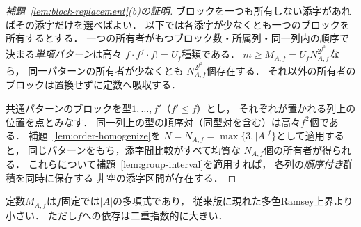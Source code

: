 \begin{proof}[補題~\ref{lem:block-replacement}(b)の証明]
ブロックを一つも所有しない添字があればその添字だけを選べばよい．
以下では各添字が少なくとも一つのブロックを所有するとする．
一つの所有者がもつブロック数・所属列・同一列内の順序で
決まる\emph{単項パターン}は高々
$f\cdot f^f\cdot f!=U_f$種類である．
$m\ge M_{A,f}=U_fN_{A,f}^{2^{f^2}}$なら，
同一パターンの所有者が少なくとも
$N_{A,f}^{2^{f^2}}$個存在する．
それ以外の所有者のブロックは置換せずに定数へ吸収する．

共通パターンのブロックを型$1,\ldots,f'$（$f'\le f$）とし，
それぞれが置かれる列上の位置を点とみなす．
同一列上の型の順序対（同型対を含む）は高々$f^2$個である．
補題~\ref{lem:order-homogenize}を
$N=N_{A,f}=\max\{3,|A|^f\}$として適用すると，
同じパターンをもち，添字間比較がすべて均質な
$N_{A,f}$個の所有者が得られる．
これらについて補題~\ref{lem:group-interval}を適用すれば，
各列の\emph{順序付き}群積を同時に保存する
非空の添字区間が存在する．
\end{proof}

定数$M_{A,f}$は$f$固定では$|A|$の多項式であり，
従来版に現れた多色Ramsey上界より小さい．
ただし$f$への依存は二重指数的に大きい．
